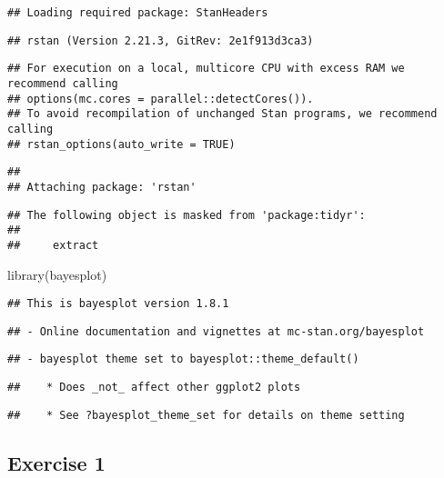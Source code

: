 \documentclass[
]{article}
\newenvironment{Shaded}{\begin{snugshade}}{\end{snugshade}}
\newcommand{\FunctionTok}[1]{\textcolor[rgb]{0.00,0.00,0.00}{#1}}
\newcommand{\NormalTok}[1]{#1}
\begin{document}
\begin{verbatim}
## Loading required package: StanHeaders
\end{verbatim}

\begin{verbatim}
## rstan (Version 2.21.3, GitRev: 2e1f913d3ca3)
\end{verbatim}

\begin{verbatim}
## For execution on a local, multicore CPU with excess RAM we recommend calling
## options(mc.cores = parallel::detectCores()).
## To avoid recompilation of unchanged Stan programs, we recommend calling
## rstan_options(auto_write = TRUE)
\end{verbatim}

\begin{verbatim}
## 
## Attaching package: 'rstan'
\end{verbatim}

\begin{verbatim}
## The following object is masked from 'package:tidyr':
## 
##     extract
\end{verbatim}

\begin{Shaded}
\begin{Highlighting}[]
\FunctionTok{library}\NormalTok{(bayesplot)}
\end{Highlighting}
\end{Shaded}

\begin{verbatim}
## This is bayesplot version 1.8.1
\end{verbatim}

\begin{verbatim}
## - Online documentation and vignettes at mc-stan.org/bayesplot
\end{verbatim}

\begin{verbatim}
## - bayesplot theme set to bayesplot::theme_default()
\end{verbatim}

\begin{verbatim}
##    * Does _not_ affect other ggplot2 plots
\end{verbatim}

\begin{verbatim}
##    * See ?bayesplot_theme_set for details on theme setting
\end{verbatim}

\hypertarget{exercise-1}{%
\subsection{Exercise 1}\label{exercise-1}}
\end{document}
